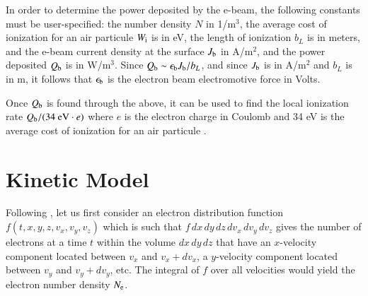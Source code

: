 \documentclass{warpdoc}
\let\citen\cite
\begin{document}
In order to determine the power deposited by the e-beam, the following constants must be user-specified: the number density $N$ in 1/m$^3$, the average cost of ionization for an air particule $W_{\rm i}$ is in eV, the length of ionization $b_L$ is in meters, and the e-beam current density at the surface $J_{\rm b}$ in A/m$^2$, and the power deposited $Q_{\rm b}$ is in W/m$^3$. Since $Q_{\rm b} \sim \epsilon_{\rm b} J_{\rm b}/b_L$, and since $J_{\rm b}$ is in A/m$^2$ and $b_L$ is in m, it follows that $\epsilon_{\rm b}$ is the electron beam electromotive force in Volts.

Once $Q_{\rm b}$ is found through the above, it can be used to find the local ionization rate $Q_{\rm b}/(34~{\rm eV} \cdot e)$  where $e$ is the electron charge in Coulomb and 34 eV is the average cost of ionization for an air particule  \citen{misc:1968:peterson}. 




\section{Kinetic Model}

Following \cite[Ch. 5]{book:1991:raizer}, let us first consider an electron distribution function $f(t,x,y,z,v_x,v_y,v_z)$ which is such that $f\, dx \, dy \, dz \, dv_x \, dv_y \, dv_z$ gives the number of electrons at a time $t$ within the volume $dx \, dy \, dz$ that have an $x$-velocity component located between $v_x$ and $v_x+dv_x$, a $y$-velocity component located between $v_y$ and $v_y+dv_y$, etc. The integral of $f$ over all velocities would yield the electron number density $N_{\rm e}$. 
\end{document}
